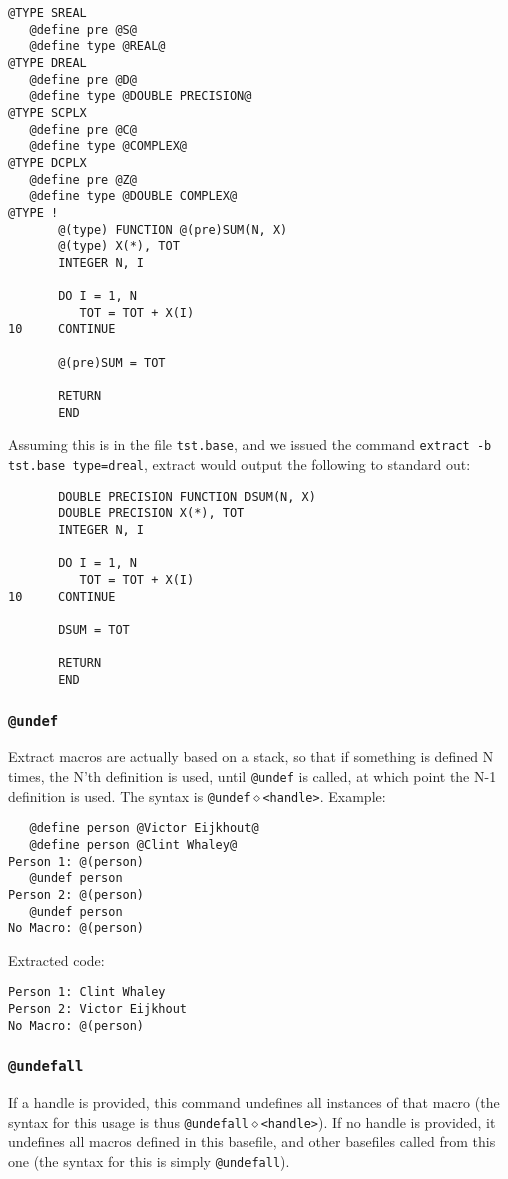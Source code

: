 \begin{verbatim}
@TYPE SREAL
   @define pre @S@
   @define type @REAL@
@TYPE DREAL
   @define pre @D@
   @define type @DOUBLE PRECISION@
@TYPE SCPLX
   @define pre @C@
   @define type @COMPLEX@
@TYPE DCPLX
   @define pre @Z@
   @define type @DOUBLE COMPLEX@
@TYPE !
       @(type) FUNCTION @(pre)SUM(N, X)
       @(type) X(*), TOT
       INTEGER N, I

       DO I = 1, N
          TOT = TOT + X(I)
10     CONTINUE

       @(pre)SUM = TOT

       RETURN
       END
\end{verbatim}

Assuming this is in the file {\tt tst.base}, and we issued the command
{\tt extract -b tst.base type=dreal}, extract would output the following
to standard out:
\begin{verbatim}
       DOUBLE PRECISION FUNCTION DSUM(N, X)
       DOUBLE PRECISION X(*), TOT
       INTEGER N, I

       DO I = 1, N
          TOT = TOT + X(I)
10     CONTINUE

       DSUM = TOT

       RETURN
       END
\end{verbatim}

\subsubsection{\tt @undef}
Extract macros are actually based on a stack, so that if something is defined
N times, the N'th definition is used, until {\tt @undef} is called, at which
point the N-1 definition is used.  The syntax is {\tt @undef$\diamond$<handle>}.
Example:
\begin{verbatim}
   @define person @Victor Eijkhout@
   @define person @Clint Whaley@
Person 1: @(person)
   @undef person
Person 2: @(person)
   @undef person
No Macro: @(person)
\end{verbatim}
Extracted code:
\begin{verbatim}
Person 1: Clint Whaley
Person 2: Victor Eijkhout
No Macro: @(person)
\end{verbatim}

\subsubsection{\tt @undefall}
If a handle is provided, this command undefines all instances of that macro
(the syntax for this usage is thus {\tt @undefall$\diamond$<handle>}).
If no handle is provided, it undefines all macros defined in this basefile,
and other basefiles called from this one (the syntax for this is simply
{\tt @undefall}).


